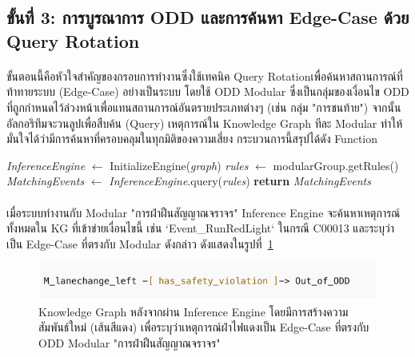\subsection{ขั้นที่ 3: การบูรณาการ ODD และการค้นหา Edge-Case ด้วย Query Rotation}\label{subsec:ch4_odd_integration}

\paragraph{}
ขั้นตอนนี้คือหัวใจสำคัญของกรอบการทำงานซึ่งใช้เทคนิค Query Rotationเพื่อค้นหาสถานการณ์ที่ท้าทายระบบ (Edge-Case) อย่างเป็นระบบ โดยใช้ ODD Modular ซึ่งเป็นกลุ่มของเงื่อนไข ODD ที่ถูกกำหนดไว้ล่วงหน้าเพื่อแทนสถานการณ์อันตรายประเภทต่างๆ (เช่น กลุ่ม "การชนท้าย") จากนั้น อัลกอริทึมจะวนลูปเพื่อสืบค้น (Query) เหตุการณ์ใน Knowledge Graph ทีละ Modular ทำให้มั่นใจได้ว่ามีการค้นหาที่ครอบคลุมในทุกมิติของความเสี่ยง กระบวนการนี้สรุปได้ดัง Function 

\begin{algorithmic}[1]
    \State \textit{InferenceEngine} $\gets$ InitializeEngine(\textit{graph})
    \State \textit{rules} $\gets$ modularGroup.getRules()
    \State \textit{MatchingEvents} $\gets$ \textit{InferenceEngine}.query(\textit{rules})
    \State \textbf{return} \textit{MatchingEvents}
\EndFunction
\end{algorithmic}

\paragraph{}
เมื่อระบบทำงานกับ Modular "การฝ่าฝืนสัญญาณจราจร" Inference Engine จะค้นหาเหตุการณ์ทั้งหมดใน KG ที่เข้าข่ายเงื่อนไขนี้ เช่น `Event\_RunRedLight` ในกรณี C00013 และระบุว่าเป็น Edge-Case ที่ตรงกับ Modular ดังกล่าว ดังแสดงในรูปที่~\ref{fig:ch4_kg_inference}

\begin{figure}[htbp]
    \centering
    \includegraphics[width=1\textwidth]{images/kg-inference-example}
    \caption{Knowledge Graph หลังจากผ่าน Inference Engine โดยมีการสร้างความสัมพันธ์ใหม่ (เส้นสีแดง) เพื่อระบุว่าเหตุการณ์ฝ่าไฟแดงเป็น Edge-Case ที่ตรงกับ ODD Modular "การฝ่าฝืนสัญญาณจราจร"}
    \label{fig:ch4_kg_inference}
\end{figure}

